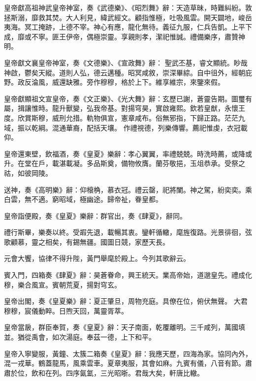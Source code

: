 \begin{pinyinscope}
 皇帝獻高祖神武皇帝神室，奏《武德樂》、《昭烈舞》辭：天造草昧，時難糾紛。敦拯斯溺，靡救其焚。大人利見，緯武經文。顧指惟極，吐吸風雲。開天闢地，峻岳夷海。冥工掩跡，上德不宰。神心有應，龍化無待。義征九服，仁兵告凱。上平下成，靡或不寧。匪王伊帝，偶極崇靈。享親則孝，潔祀惟誠。禮備樂序，肅贊神明。



 皇帝獻文襄皇帝神室，奏《文德樂》、《宣政舞》辭：
 聖武丕基，睿文顯統。眇哉神啟，鬱矣天縱。道則人弘，德云邁種。昭冥咸敘，崇深畢綜。自中徂外，經朝庇野。政反淪風，威還缺雅。旁作穆穆，格於上下。維享維宗，來鑒來假。



 皇帝獻顯祖文宣皇帝，奏《文正樂》、《光大舞》辭：玄歷已謝，蒼靈告期。圖璽有屬，揖讓惟時。龍升獸變，弘我帝基。對揚穹昊，實啟雍熙。欽若皇猷，永懷王度。欣賞斯穆，威刑允措。軌物俱宣，憲章咸布。俗無邪指，下歸正路。茫茫九域，振以乾綱。混通華裔，配括天壤。
 作禮視德，列樂傳響。薦祀惟虔，衣冠載仰。



 皇帝還東壁，飲福酒，奏《皇夏》樂辭：孝心翼翼，率禮兢兢。時洗時薦，或降或升。在堂在戶，載湛載凝。多品斯奠，備物攸膺。蘭芬敬挹，玉俎恭承。受祭之祜，如彼岡陵。



 送神，奏《高明樂》辭：仰榱桷，慕衣冠。禮云罄，祀將闌。神之駕，紛奕奕。乘白雲，無不適。窮昭域，極幽途。歸帝祉，眷皇都。



 皇帝詣便殿，奏《皇夏》樂辭：群官出，奏《肆夏》，辭同。



 禮行斯畢，樂奏以終。受嘏先退，載暢其衷。鑾軒循轍，麾旌復路。光景徘徊，弦歌顧慕，靈之相矣，有錫無疆。國圖日競，家歷天長。



 元會大饗，協律不得升陛，黃門舉麾於殿上。今列其歌辭云。



 賓入門，四箱奏《肆夏》辭：昊蒼眷命，興王統天。業高帝始，道邈皇先。禮成化穆，樂合風宣。賓朝荒夏，揚對穹玄。



 皇帝出閣，奏《皇夏樂》辭：夏正肇旦，周物充庭。具僚在位，俯伏無聲。
 大君穆穆，宸儀動睟。日煦天回，萬靈胥萃。



 皇帝當扆，群臣奉賀，奏《皇夏》辭：天子南面，乾覆離明。三千咸列，萬國填並。猶從禹會，如次湯庭。奉茲一德，上下和平。



 皇帝入寧變服，黃鐘、太簇二箱奏《皇夏》辭：我應天歷，四海為家。協同內外，混一戎華。鶴蓋龍馬，風乘雲車。夏章夷服，其會如麻。九賓有儀，八音有節。肅肅於位，飲和在列。四序氤氳，三光昭晣。君哉大矣，軒唐比轍。




\end{pinyinscope}
